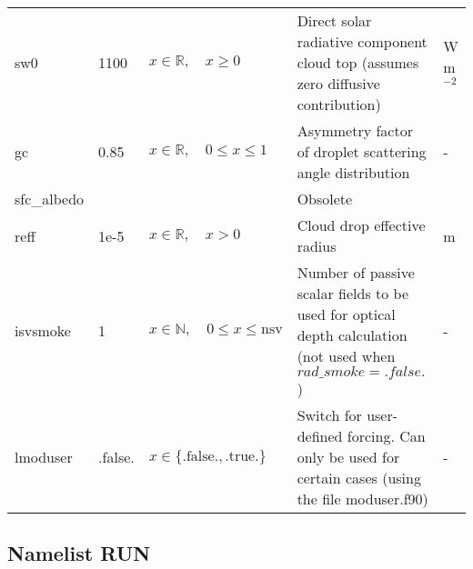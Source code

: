 \documentclass[twoside,11pt,fleqn,a4paper,english,openright]{report}
\begin{document}
\begin{center}
\begin{supertabular}{|l|p{1.6cm}|p{4cm}|p{6cm}|l|}
  sw0		& 1100		& $x \in \mathbb{R}, \quad x \ge 0$	& Direct solar radiative component cloud top (assumes zero diffusive contribution)	& W m$^{-2}$\\
  gc		& 0.85		& $x \in \mathbb{R}, \quad 0 \leq x \leq 1$	& Asymmetry factor of droplet scattering angle distribution & -\\
  sfc\_albedo	& 	& 	& Obsolete & \\
  reff		& 1e-5		& $x \in \mathbb{R}, \quad x>0$	& Cloud drop effective radius					& m\\
  isvsmoke	& 1		& $x \in \mathbb{N}, \quad 0 \leq x \leq \text{nsv}$	& Number of passive scalar fields to be used for optical depth calculation (not used when $rad\_smoke = .false.$)	& -\\
  lmoduser	& .false. & $x\in\{\text{.false.},\text{.true.}\}$ & Switch for user-defined forcing. Can only be used for certain cases (using the file moduser.f90) & -\\
\end{supertabular}
\end{center}

\subsection{Namelist RUN}\label{par:run}
\end{document}
